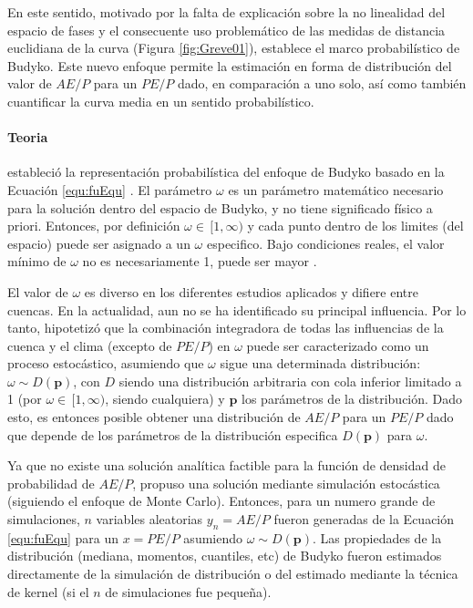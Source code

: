 \documentclass[12pt]{article}
\begin{document}


En este sentido, \citet{Greve2015} motivado por la falta de explicación sobre la no linealidad del espacio de fases y el consecuente uso problemático de las medidas de distancia euclidiana de la curva (Figura \ref{fig:Greve01}), establece el marco probabilístico de Budyko. Este nuevo enfoque permite la estimación en forma de distribución del valor de $AE/P$ para un $PE/P$ dado, en comparación a uno solo, así como también cuantificar la curva media en un sentido probabilístico.

\paragraph{Teoria}\mbox{}

\citet{Greve2015} estableció la representación probabilística del enfoque de Budyko basado en la Ecuación \ref{equ:fuEqu} \citep{Fu1981}. El parámetro $\omega$ es un parámetro matemático necesario para la solución dentro del espacio de Budyko, y no tiene significado físico a priori. Entonces, por definición $\omega \in\,[1,\infty)$ y cada punto dentro de los limites (del espacio) puede ser asignado a un $\omega$ especifico. Bajo condiciones reales, el valor mínimo de $\omega$ no es necesariamente 1, puede ser mayor \citep{Zhang2004}. 

\thispagestyle{empty}

El valor de $\omega$ es diverso en los diferentes estudios aplicados y difiere entre cuencas. En la actualidad, aun no se ha identificado su principal influencia. Por lo tanto, \citet{Greve2015} hipotetizó que la combinación integradora de todas las influencias de la cuenca y el clima (excepto de $PE/P$) en $\omega$ puede ser caracterizado como un proceso estocástico, asumiendo que $\omega$ sigue una determinada distribución: $\omega \sim D(\textbf{p})$, con $D$ siendo una distribución arbitraria con cola inferior limitado a 1 (por $\omega \in\,[1,\infty)$, siendo cualquiera) y $\textbf{p}$ los parámetros de la distribución. Dado esto, es entonces posible obtener una distribución de $AE/P$ para un $PE/P$ dado que depende de los parámetros de la distribución especifica $D(\textbf{p})$ para $\omega$.

Ya que no existe una solución analítica factible para la función de densidad de probabilidad de $AE/P$, \citet{Greve2015} propuso una solución mediante simulación estocástica (siguiendo el enfoque de Monte Carlo). Entonces, para un numero grande de simulaciones, $n$ variables aleatorias $y_{n} = AE/P$ fueron generadas de la Ecuación \ref{equ:fuEqu} para un $x = PE/P$ asumiendo $\omega \sim D(\textbf{p})$. Las propiedades de la distribución (mediana, momentos, cuantiles, etc) de Budyko fueron estimados directamente de la simulación de distribución o del estimado mediante la técnica de kernel (si el $n$ de simulaciones fue pequeña).
\end{document}
